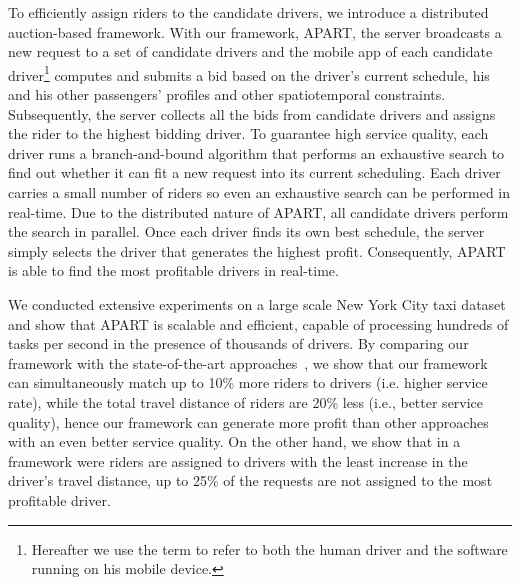 

To efficiently assign riders to the candidate drivers, we introduce a distributed auction-based framework. With our framework, APART, the server broadcasts a new request to a set of candidate drivers and the mobile app of each candidate driver\footnote{Hereafter we use the term  to refer to both the human driver and the software running on his mobile device.} computes and submits a bid based on the driver's current schedule, his and his other passengers' profiles and other spatiotemporal constraints. Subsequently, the server collects all the bids from candidate drivers and assigns the rider to the highest bidding driver. To guarantee high service quality, each driver runs a branch-and-bound algorithm that performs an exhaustive search to find out whether it can fit a new request into its current scheduling. Each driver carries a small number of riders so even an exhaustive search can be performed in real-time. Due to the distributed nature of APART, all candidate drivers perform the search in parallel. Once each driver finds its own best schedule, the server simply selects the driver that generates the highest profit. Consequently, APART is able to find the most profitable drivers in real-time.




We conducted extensive experiments on a large scale New York City taxi dataset and show that APART is scalable and efficient, capable of processing hundreds of tasks per second in the presence of thousands of drivers. By comparing our framework with the state-of-the-art approaches~\cite{Huang14}, we show that our framework can simultaneously match up to 10\% more riders to drivers (i.e. higher service rate), while the total travel distance of riders are 20\% less (i.e., better service quality), hence our framework can generate more profit than other approaches with an even better service quality. On the other hand, we show that in a framework were riders are assigned to drivers with the least increase in the driver's travel distance, up to 25\% of the requests are not assigned to the most profitable driver. 

